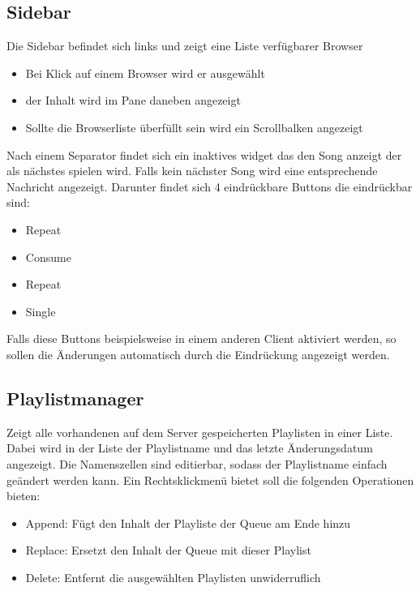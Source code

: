 \subsection{Sidebar}
Die Sidebar befindet sich links und zeigt eine Liste verfügbarer Browser
\begin{itemize}
  \item Bei Klick auf einem Browser wird er ausgewählt
  \item der Inhalt wird im Pane daneben angezeigt
  \item Sollte die Browserliste überfüllt sein wird ein Scrollbalken angezeigt
\end{itemize}
Nach einem Separator findet sich ein inaktives widget das den Song anzeigt der als nächstes spielen wird.
Falls kein nächster Song wird eine entsprechende Nachricht angezeigt.
Darunter findet sich 4 eindrückbare Buttons die eindrückbar sind:
\begin{itemize}
  \item Repeat
  \item Consume
  \item Repeat
  \item Single
\end{itemize}
Falls diese Buttons beispielsweise in einem anderen Client aktiviert werden, 
so sollen die Änderungen automatisch durch die Eindrückung angezeigt werden.



\subsection{Playlistmanager}
Zeigt alle vorhandenen auf dem Server gespeicherten Playlisten in einer Liste.
Dabei wird in der Liste der Playlistname und das letzte Änderungsdatum angezeigt.
Die Namenszellen sind editierbar, sodass der Playlistname einfach geändert werden kann. 
Ein Rechtsklickmenü bietet soll die folgenden Operationen bieten:
 \begin{itemize}
   \item Append: Fügt den Inhalt der Playliste der Queue am Ende hinzu
   \item Replace: Ersetzt den Inhalt der Queue mit dieser Playlist
   \item Delete: Entfernt die ausgewählten Playlisten unwiderruflich
 \end{itemize}   


